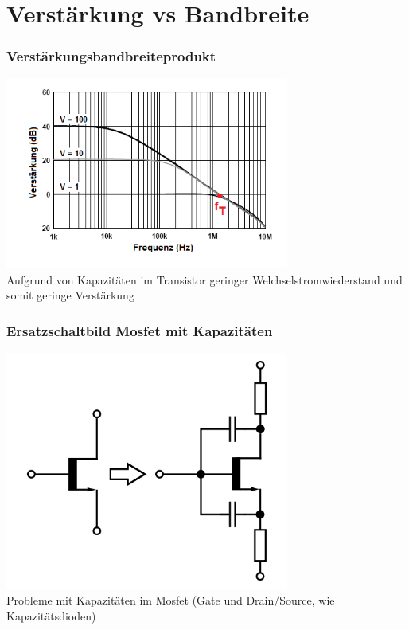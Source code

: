 \section*{Verstärkung vs Bandbreite}

\begin{frame}
    \frametitle{Verstärkungsbandbreiteprodukt}
    \begin{center}
        \includegraphics[width=0.7\textwidth]{a07/Closed_loop_gain.png}
        \tiny \hyperlink{refs}{\cite{wm}} \\[3em]
     	\large Aufgrund von Kapazitäten im Transistor geringer Welchselstromwiederstand und somit geringe Verstärkung
     \end{center}
\end{frame}

\begin{frame}
    \frametitle{Ersatzschaltbild Mosfet mit Kapazitäten}
    \begin{center}
        \includegraphics[width=0.7\textwidth]{a07/HF_Ersatzschaltbild.png}
        \tiny \hyperlink{refs}{\cite{wm}} \\[3em]
     	\large Probleme mit Kapazitäten im Mosfet (Gate und Drain/Source, wie Kapazitätsdioden)
     \end{center}
\end{frame}

